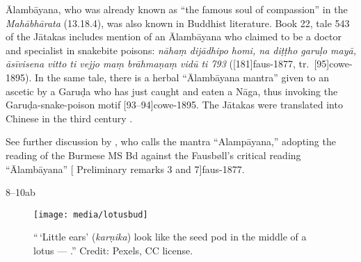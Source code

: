 \begin{translation}
{Ālambāyana, who was already known as “the famous soul of compassion”
in the \emph{Mahābhārata} (13.18.4), was also known in Buddhist
literature. Book 22, tale 543 of the Jātakas includes mention of
an Ālambāyana who claimed to be a doctor and specialist in
snakebite poisons: \emph{nāhaṃ dijādhipo homi, na diṭṭho garuḷo
mayā, āsīvisena vitto ti vejjo maṃ brāhmaṇaṃ vidū ti 793}
([181]{faus-1877}, tr.\  [95]{cowe-1895}).
In the same tale, there is a herbal “Ālambāyana mantra” given to
an ascetic by a Garuḍa who has just caught and eaten a Nāga, thus
invoking the Garuḍa-snake-poison motif
[93--94]{cowe-1895}.  The Jātakas were translated
into Chinese in the third century \CE.
    
    See further discussion by \citet[33--34]{slou-2016}, who calls
    the mantra “Alampāyana,” adopting the reading of the Burmese MS
    Bd against the Fausbøll's critical reading  “Ālambāyana” 
    [ Preliminary remarks 3 and 7]{faus-1877}.}
    
\item[8--10ab]

\begin{figure}
    \centering
    \texttt{[image: media/lotusbud]}
    \caption{“\,`Little ears' (\emph{karṇika}) look like the seed pod in the middle 
    of a lotus --- .” Credit: Pexels, CC license.}
    \label{fig:lotusbud}
\end{figure}


\end{translation}
